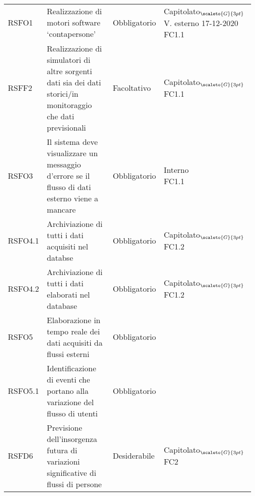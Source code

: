 \def\tabularxcolumn#1{m{#1}}
{
	
	\begin{center}
		\renewcommand{\arraystretch}{1.4}
		\begin{longtable}{|p{3cm}|p{4cm}|p{4cm}|p{4cm}|} 
			\hline
			\rowcolor{airforceblue}
			\makecell[c]{\textbf{Codice RS}} & \makecell[c]{\textbf{Descrizione}} & \makecell[c]{\textbf{Tipo di requisito}} & \makecell[c]{\textbf{Fonte}} \\
			\hline
			\centering RSFO1 & Realizzazione di motori software ‘contapersone’  &\centering  Obbligatorio & \makecell[tc]{Capitolato$_{\scaleto{G}{3pt}}$ \\ V. esterno 17-12-2020 \\ FC1.1} \\
			\hline
			\centering RSFF2 & Realizzazione di simulatori di altre sorgenti dati sia dei dati storici/in monitoraggio che dati previsionali & \centering Facoltativo & \makecell[tc]{Capitolato$_{\scaleto{G}{3pt}}$ \\ FC1.1} \\
			\hline
			\centering RSFO3  & Il sistema deve visualizzare un messaggio d'errore se il flusso di dati esterno viene a mancare  &\centering  Obbligatorio & \makecell[tc]{Interno\\FC1.1}  \\
			\hline
			\centering RSFO4.1 & Archiviazione di tutti i dati acquisiti nel databse & \centering Obbligatorio & \makecell[tc]{Capitolato$_{\scaleto{G}{3pt}}$ \\ FC1.2}  \\
			\hline
			\centering RSFO4.2 & Archiviazione di tutti i dati elaborati nel database & \centering Obbligatorio & \makecell[tc]{Capitolato$_{\scaleto{G}{3pt}}$ \\ FC1.2}  \\
			\hline
			\centering RSFO5 & Elaborazione in tempo reale dei dati acquisiti da flussi esterni &\centering  Obbligatorio & \makecell[tc]{Capitolato$_{\scaleto{G}{3pt}}$}  \\
			\hline
			\centering RSFO5.1 & Identificazione di eventi che portano alla variazione del flusso di utenti &\centering  Obbligatorio & \makecell[tc]{Capitolato$_{\scaleto{G}{3pt}}$}  \\
			\hline
			\centering RSFD6 & Previsione dell'insorgenza futura di variazioni significative di flussi di persone & \centering Desiderabile & \makecell[tc]{Capitolato$_{\scaleto{G}{3pt}}$ \\ FC2}  \\

\end{longtable}
\end{center}}
